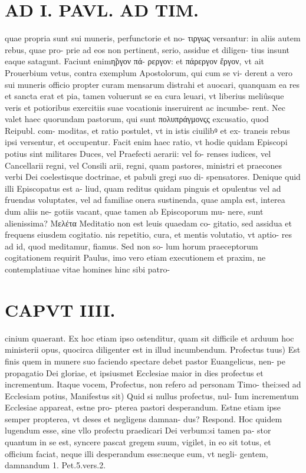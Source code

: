 \documentclass{article}
\begin{document}
\begin{pages}
\section*{AD I. PAVL. AD TIM. }
\marginpar{[ p.430 ]}\pstart quae propria sunt sui muneris, perfunctorie et no- τιργως versantur: in aliis autem rebus, quae pro- prie ad eos non pertinent, serio, assidue et diligen- tius insunt eaque satagunt. Faciunt enimη̃ργον πά- ρεργον: et πάρεργον ἔργον, vt ait Prouerbium vetus, contra exemplum Apostolorum, qui cum se vi- derent a vero sui muneris officio propter curam mensarum distrahi et auocari, quanquam ea res et sancta erat et pia, tamen voluerunt se ea cura leuari, vt liberius meliûsque veris et potioribus exercitiis suae vocationis inseruirent ac incumbe- rent. Nec valet haec quorundam pastorum, qui sunt πολυπράγμονςς excusatio, quod Reipubl. com- moditas, et ratio postulet, vt in istis ciuilibꝰ et ex- traneis rebus ipsi versentur, et occupentur. Facit enim haec ratio, vt hodie quidam Episcopi potius sint militares Duces, vel Praefecti aerarii: vel fo- renses iudices, vel Cancellarii regni, vel Consili arii, regni, quam pastores, ministri et praecones verbi Dei coelestisque doctrinae, et pabuli gregi suo di- spensatores. Denique quid illi Episcopatus est a- liud, quam reditus quidam pinguis et opulentus vel ad fruendas voluptates, vel ad familiae onera sustinenda, quae ampla est, interea dum aliis ne- gotiis vacant, quae tamen ab Episcoporum mu- nere, sunt alienissima? Μελέτα Meditatio non est leuis quaedam co- gitatio, sed assidua et frequens eiusdem cogitatio. nis repetitio, cura, et mentis volutatio, vt aptio- res ad id, quod meditamur, fiamus. Sed non so- lum horum praeceptorum cogitationem requirit Paulus, imo vero etiam executionem et praxim, ne contemplatiuae vitae homines hinc sibi patro-  \pend
\section*{CAPVT  IIII. }
\marginpar{[ p.237 ]}\pstart cinium quaerant. Ex hoc etiam ipso ostenditur, quam sit difficile et arduum hoc ministerii opus, quocirca diligenter est in illud incumbendum. Profectus tuus) Est finis quem in munere suo faciendo spectare debet pastor Euangelicus, nen- pe propagatio Dei gloriae, et ipsiusmet Ecclesiae maior in dies profectus et incrementum. Itaque vocem, Profectus, non refero ad personam Timo- thei:sed ad Ecclesiam potius, Manifestus sit) Quid si nullus profectus, nul- Ium incrementum Ecclesiae appareat, estne pro- pterea pastori desperandum. Estne etiam ipse semper propterea, vt deses et negligens damnan- dus? Respond. Hoc quidem lugendum esse, sine vllo profectu praedicari Dei verbum:si tamen pa- stor quantum in se est, syncere pascat gregem suum, vigilet, in eo sit totus, et officium faciat, neque illi desperandum esse:neque eum, vt negli- gentem, damnandum 1. Pet.5.vers.2.  \pend\pstart {}
{}

\end{pages}
\end{document}
